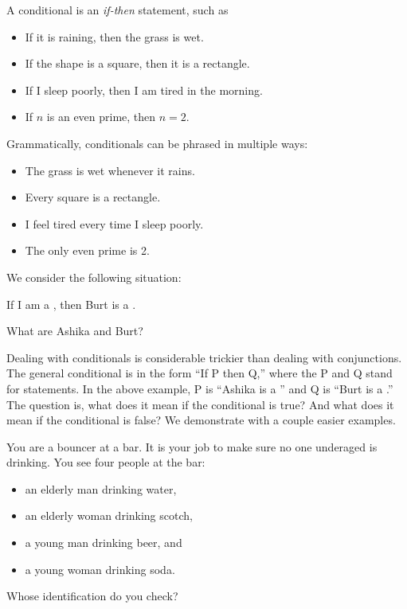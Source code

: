 \documentclass{tufte-book}
\begin{document}
A conditional is an \emph{if-then} statement, such as
\begin{itemize}
    \item If it is raining, then the grass is wet.
    \item If the shape is a square, then it is a rectangle.
    \item If I sleep poorly, then I am tired in the morning.
    \item If $n$ is an even prime, then $n = 2$.
\end{itemize}
Grammatically, conditionals can be phrased in multiple ways:
\begin{itemize}
    \item The grass is wet whenever it rains.
    \item Every square is a rectangle.
    \item I feel tired every time I sleep poorly.
    \item The only even prime is 2.
\end{itemize}

We consider the following situation:
\begin{example}
  \begin{dialogue}
     If I am a \knight, then Burt is a \knave.
  \end{dialogue}
\end{example}
What are Ashika and Burt?

Dealing with conditionals is considerable trickier than dealing with conjunctions. The general conditional is in the form ``If P then Q,'' where the P and Q stand for statements. In the above example, P is ``Ashika is a \knight'' and Q is ``Burt is a \knave.'' The question is, what does it mean if the conditional is true? And what does it mean if the conditional is false? We demonstrate with a couple easier examples.

\begin{example}
  You are a bouncer at a bar. It is your job to make sure no one underaged is drinking. You see four people at the bar:
  \begin{itemize}
      \item an elderly man drinking water,
      \item an elderly woman drinking scotch,
      \item a young man drinking beer, and
      \item a young woman drinking soda.
  \end{itemize}
  Whose identification do you check?
\end{example}
\end{document}
